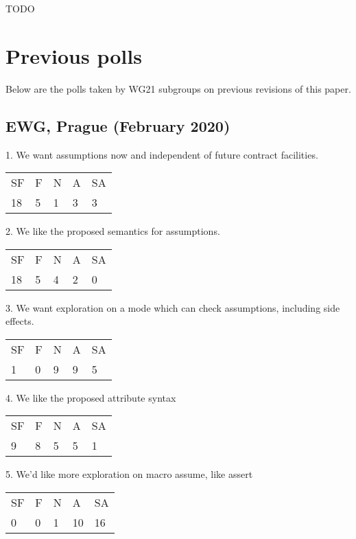 TODO

\section {Previous polls}

Below are the polls taken by WG21 subgroups on previous revisions of this paper.

\subsection{EWG, Prague (February 2020)}

1. We want assumptions now and independent of future contract facilities.

\hspace{6mm}
\begin{tabular}{lllll}
SF & F & N & A & SA \\
18 & 5 & 1 & 3 & 3
\end{tabular}

2. We like the proposed semantics for assumptions.

\hspace{6mm}
\begin{tabular}{lllll}
SF & F & N & A & SA \\
18 & 5 & 4 & 2 & 0
\end{tabular}

3. We want exploration on a mode which can check assumptions, including side effects.

\hspace{6mm}
\begin{tabular}{lllll}
SF & F & N & A & SA \\
1 & 0 & 9 & 9 & 5
\end{tabular}

4. We like the proposed attribute syntax 

\hspace{6mm}
\begin{tabular}{lllll}
SF & F & N & A & SA \\
9 & 8 & 5 & 5 & 1
\end{tabular}

5. We’d like more exploration on macro assume, like assert

\hspace{6mm}
\begin{tabular}{lllll}
SF & F & N & A & SA \\
0 & 0 & 1 & 10 & 16
\end{tabular}

